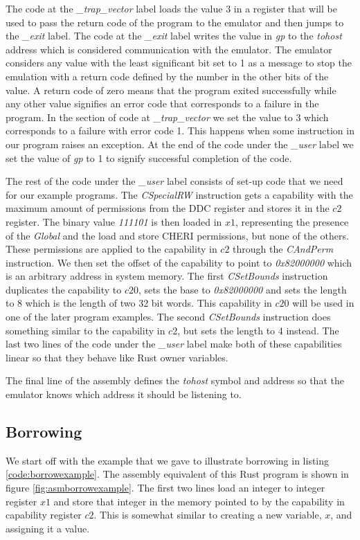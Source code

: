 The code at the \textit{\_trap\_vector} label loads the value 3 in a register that will be used to pass the return code of the program to the emulator and then jumps to the \textit{\_exit} label.
The code at the \textit{\_exit} label writes the value in \textit{gp} to the \textit{tohost} address which is considered communication with the emulator.
The emulator considers any value with the least significant bit set to 1 as a message to stop the emulation with a return code defined by the number in the other bits of the value.
A return code of zero means that the program exited successfully while any other value signifies an error code that corresponds to a failure in the program.
In the section of code at \textit{\_trap\_vector} we set the value to 3 which corresponds to a failure with error code 1.
This happens when some instruction in our program raises an exception.
At the end of the code under the \textit{\_user} label we set the value of \textit{gp} to 1 to signify successful completion of the code.

The rest of the code under the \textit{\_user} label consists of set-up code that we need for our example programs.
The \textit{CSpecialRW} instruction gets a capability with the maximum amount of permissions from the DDC register and stores it in the $c2$ register.
The binary value \textit{111101} is then loaded in $x1$, representing the presence of the \textit{Global} and the load and store CHERI permissions, but none of the others.
These permissions are applied to the capability in $c2$ through the \textit{CAndPerm} instruction.
We then set the offset of the capability to point to \textit{0x82000000} which is an arbitrary address in system memory.
The first \textit{CSetBounds} instruction duplicates the capability to $c20$, sets the base to \textit{0x82000000} and sets the length to 8 which is the length of two 32 bit words.
This capability in $c20$ will be used in one of the later program examples.
The second \textit{CSetBounds} instruction does something similar to the capability in $c2$, but sets the length to 4 instead.
The last two lines of the code under the \textit{\_user} label make both of these capabilities linear so that they behave like Rust owner variables.

The final line of the assembly defines the \textit{tohost} symbol and address so that the emulator knows which address it should be listening to.

\subsection{Borrowing}
We start off with the example that we gave to illustrate borrowing in listing \ref{code:borrowexample}.
The assembly equivalent of this Rust program is shown in figure \ref{fig:asmborrowexample}.
The first two lines load an integer to integer register $x1$ and store that integer in the memory pointed to by the capability in capability register $c2$.
This is somewhat similar to creating a new variable, $x$, and assigning it a value.


